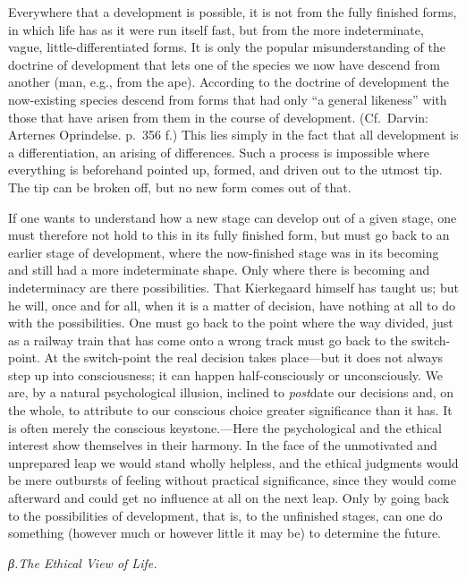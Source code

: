 \documentclass[12pt,a4paper]{book}
\newcommand{\opage}[1]{\marginnote{\footnotesize\textit{[#1]}}}
\begin{document}
Everywhere that a development is possible, it is not from the fully
finished forms, in which life has as it were run itself fast, but from the
more indeterminate, vague, little-differentiated forms. It is only the
popular misunderstanding of the doctrine of development that lets one of
the species we now have descend from another (man, e.g., from the ape).
According to the doctrine of development the now-existing species descend
from forms that had only ``a general likeness'' with those that have
arisen from them in the course of development.
(Cf.\ Darvin: Arternes Oprindelse. p.~356 f.) This lies simply in the fact
that all development is a differentiation, an arising of differences.
\opage{91}Such a process is impossible where everything is beforehand
pointed up, formed, and driven out to the utmost tip. The tip can be
broken off, but no new form comes out of that.

If one wants to understand how a new stage can develop out of a given
stage, one must therefore not hold to this in its fully finished form, but
must go back to an earlier stage of development, where the now-finished
stage was in its becoming and still had a more indeterminate shape. Only
where there is becoming and indeterminacy are there possibilities. That
Kierkegaard himself has taught us; but he will, once and for all, when it
is a matter of decision, have nothing at all to do with the possibilities.
One must go back to the point where the way divided, just as a railway
train that has come onto a wrong track must go back to the switch-point.
At the switch-point the real decision takes place---but it does not always
step up into consciousness; it can happen half-consciously or
unconsciously. We are, by a natural psychological illusion, inclined to
\textit{post}date our decisions and, on the whole, to attribute to our
conscious choice greater significance than it has. It is often merely the
conscious keystone.---Here the psychological and the ethical interest show
themselves in their harmony. In the face of the unmotivated and unprepared
leap we would stand wholly helpless, and the ethical judgments would be
mere outbursts of feeling without practical significance, since they would
come afterward and could get no influence at all on the next leap. Only by
going back to the possibilities of development, that is, to the unfinished
stages, can one do something (however much or however little it may be)
to determine the future.
\opage{92}\begin{center}\textit{β.\enspace The Ethical View of Life.}\end{center}
\end{document}
